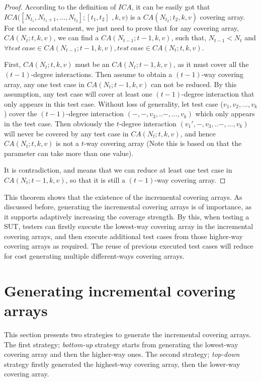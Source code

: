 \documentclass[conference]{IEEEtran}
\theoremstyle{definition}
\begin{document}
\begin{proof}
According to the definition of $ICA$, it can be easily got that $ICA([N_{t_{1}},N_{t_{1} + 1},...,N_{t_{2}}];[t_{1},t_{2}]$ $, k, v)$ is a $CA(N_{t_{2}}; t_{2}, k, v)$ covering array. For the second statement, we just need to prove that for any covering array, $CA(N_{t}; t, k, v)$, we can find a $CA(N_{t-1}; t-1, k, v)$, such that, $N_{t-1} < N_{t}$ and $\forall test\ case \in CA(N_{t-1}; t-1, k, v), test\ case\in CA(N_{t}; t, k, v)$.

 First, $CA(N_{t}; t, k, v)$  must be an $CA(N_{t}; t - 1, k, v)$, as it must cover all the $(t-1)$-degree interactions. Then assume to obtain a $(t-1)$-way covering array, any one test case in $CA(N_{t}; t - 1, k, v)$ can not be reduced. By this assumption, any test case will cover at least one $(t-1)$-degree interaction that only appears in this test case. Without loss of generality,  let test case  ($v_{1}, v_{2}, ..., v_{k}$) cover the $(t-1)$-degree interaction $(-, -, v_{3},.. -,...,v_{k})$ which only appears in the test case. Then obviously the $t$-degree interaction $(v_{1}', -, v_{3},.. -,...,v_{k})$  will never be covered by any test case in $CA(N_{t}; t, k, v)$, and hence $CA(N_{t}; t, k, v)$ is not a $t$-way covering array (Note this is based on that the parameter can take more than one value).

 It is contradiction, and means that we can reduce at least one test case in $CA(N_{t}; t - 1, k, v)$, so that it is still a $(t-1)$-way covering array.
\end{proof}

This theorem shows that the existence of the incremental covering arrays. As discussed before, generating the incremental covering arrays is of importance, as it supports adaptively increasing the coverage strength. By this, when testing a SUT, testers can firstly execute the lowest-way covering array in the incremental covering arrays, and then execute additional test cases from those higher-way covering arrays as required. The reuse of previous executed test cases will reduce for cost generating multiple different-ways covering arrays.

\section{Generating incremental covering arrays}
This section presents two strategies to generate the incremental covering arrays. The first strategy; \emph{bottom-up} strategy starts from generating the lowest-way covering array and then the higher-way ones. The second strategy;  \emph{top-down} strategy firstly generated the highest-way covering array, then the lower-way covering array.
\end{document}
